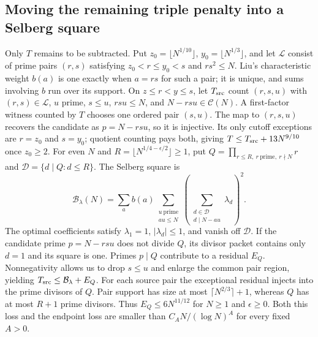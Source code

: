 \subsection{Moving the remaining triple penalty into a Selberg square}
Only $T$ remains to be subtracted.  Put $z_0=\lfloor N^{1/10}\rfloor$,
$y_0=\lfloor N^{1/3}\rfloor$, and let $\mathcal L$ consist of prime pairs
$(r,s)$ satisfying $z_0<r\le y_0<s$ and $rs^2\le N$.
Liu's characteristic weight $b(a)$ is one exactly when $a=rs$ for such
a pair; it is unique, and sums involving $b$ run over its support.  On $z\le r<y\le s$,
let $T_{\rm src}$ count $(r,s,u)$ with $(r,s)\in\mathcal L$,
$u$ prime, $s\le u$, $rsu\le N$, and $N-rsu\in\mathcal C(N)$.
A first-factor witness counted by $T$ chooses one ordered pair $(s,u)$.
The map to $(r,s,u)$ recovers the candidate as $p=N-rsu$, so it is injective.
Its only cutoff exceptions are $r=z_0$ and $s=y_0$; quotient counting pays
both, giving $T\le T_{\rm src}+13N^{9/10}$ once $z_0\ge2$.
For even $N$ and $R=\lfloor N^{1/4-\epsilon/2}\rfloor\ge1$, put
$Q=\prod_{r\le R,\ r\ \text{prime},\ r\nmid N}r$ and
$\mathcal D=\{d\mid Q:d\le R\}$.  The Selberg square is
\[
 \mathcal B_\lambda(N)=\sum_a b(a)
   \sum_{\substack{u\ \text{prime}\\au\le N}}
       \left(\sum_{\substack{d\in\mathcal D\\d\mid N-au}}\lambda_d\right)^2.
\]
The optimal coefficients satisfy $\lambda_1=1$, $|\lambda_d|\le1$, and vanish off $\mathcal D$.  If the candidate prime $p=N-rsu$ does not
divide $Q$, its divisor packet contains only $d=1$ and its square is one.
Primes $p\mid Q$ contribute to a residual $E_Q$.  Nonnegativity allows us to drop $s\le u$ and enlarge the common pair region,
yielding $T_{\rm src}\le\mathcal B_\lambda+E_Q$.
For each source pair the exceptional residual injects into the prime divisors
of $Q$.  Pair support has size at most $\lceil N^{2/3}\rceil+1$, whereas
$Q$ has at most $R+1$ prime divisors.  Thus $E_Q\le6N^{11/12}$ for
$N\ge1$ and $\epsilon\ge0$.  Both this loss and the endpoint loss are
smaller than $C_A N/(\log N)^A$ for every fixed $A>0$.

